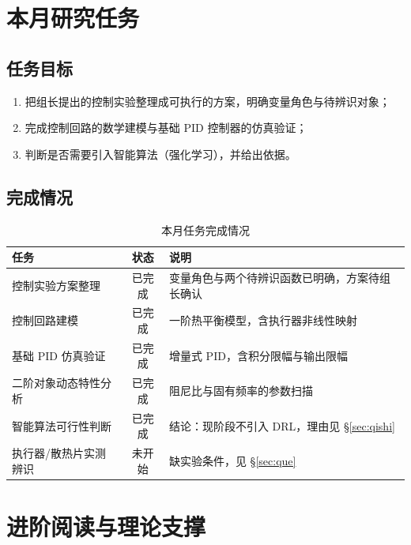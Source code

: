 \documentclass[stage2]{ydzjreport}
\begin{document}
\makestagetwohead

\section{本月研究任务}

\subsection{任务目标}

\begin{enumerate}
  \item 把组长提出的控制实验整理成可执行的方案，明确变量角色与待辨识对象；
  \item 完成控制回路的数学建模与基础 PID 控制器的仿真验证；
  \item 判断是否需要引入智能算法（强化学习），并给出依据。
\end{enumerate}

\subsection{完成情况}

\begin{table}[htbp]
\centering
\caption{本月任务完成情况}
\begin{tabularx}{\textwidth}{@{}Y c Y@{}}
\toprule
{} 任务 & 状态 & 说明 \\
\midrule
控制实验方案整理 & 已完成 & 变量角色与两个待辨识函数已明确，方案待组长确认 \\
控制回路建模 & 已完成 & 一阶热平衡模型，含执行器非线性映射 \\
基础 PID 仿真验证 & 已完成 & 增量式 PID，含积分限幅与输出限幅 \\
二阶对象动态特性分析 & 已完成 & 阻尼比与固有频率的参数扫描 \\
智能算法可行性判断 & 已完成 & 结论：现阶段不引入 DRL，理由见 §\ref{sec:qishi} \\
执行器/散热片实测辨识 & 未开始 & 缺实验条件，见 §\ref{sec:que} \\
\bottomrule
\end{tabularx}
\end{table}

\section{进阶阅读与理论支撑}
\end{document}
